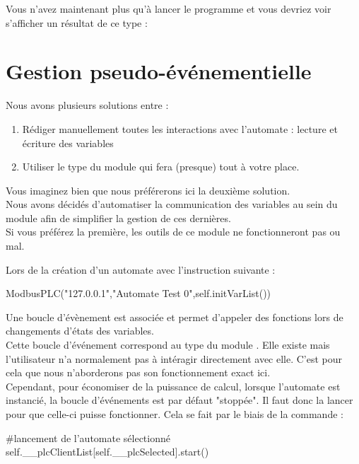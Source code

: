 \documentclass[12pt]{report}    %
\begin{document}
Vous n'avez maintenant plus qu'à lancer le programme
et vous devriez voir s'afficher un résultat de ce type :




\section{Gestion pseudo-événementielle}

Nous avons plusieurs solutions entre : 
\begin{enumerate}
\item Rédiger manuellement toutes les interactions avec l'automate : lecture et écriture des variables
\item Utiliser le type  du module  qui fera (presque) tout à votre place.
\end{enumerate}
Vous imaginez bien que nous préférerons ici la deuxième solution.\\
Nous avons décidés d'automatiser la communication des variables au sein du module 
 afin de simplifier la gestion de ces dernières. \\
Si vous préférez la première, les outils de ce module ne fonctionneront pas ou mal.\smallSkip

Lors de la création d'un automate avec l'instruction suivante :
\begin{pyCode}
ModbusPLC("127.0.0.1","Automate Test 0",self.initVarList())
\end{pyCode}
Une boucle d'évènement est associée et permet d'appeler des fonctions lors de changements d'états des variables. \\
Cette boucle d'événement correspond au type  du module . Elle existe mais l'utilisateur n'a normalement pas à intéragir directement avec elle. C'est pour cela que nous n'aborderons pas son fonctionnement exact ici.\\

Cependant, pour économiser de la puissance de calcul, lorsque l'automate est instancié, la boucle d'événements est par défaut "stoppée". Il faut donc la lancer pour que celle-ci puisse fonctionner. Cela se fait par le biais de la commande :
\begin{pyCode}
	#lancement de l'automate sélectionné
	self.__plcClientList[self.__plcSelected].start()
\end{pyCode}
\end{document}
